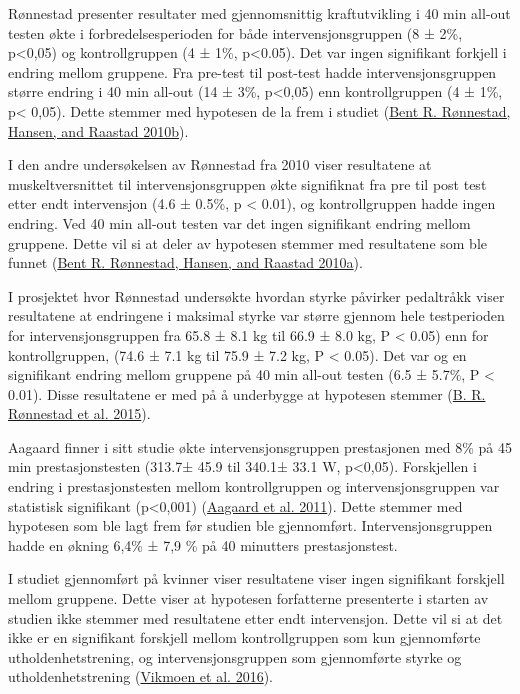 \documentclass[
]{book}
\begin{document}
Rønnestad presenter resultater med gjennomsnittig kraftutvikling i 40
min all-out testen økte i forbredelsesperioden for både
intervensjonsgruppen (8 ± 2\%, p\textless0,05) og kontrollgruppen (4 ±
1\%, p\textless0.05). Det var ingen signifikant forkjell i endring
mellom gruppene. Fra pre-test til post-test hadde intervensjonsgruppen
større endring i 40 min all-out (14 ± 3\%, p\textless0,05) enn
kontrollgruppen (4 ± 1\%, p\textless{} 0,05). Dette stemmer med
hypotesen de la frem i studiet
(\protect\hyperlink{ref-ruxf8nnestad2010a}{Bent R. Rønnestad, Hansen,
and Raastad 2010b}).

I den andre undersøkelsen av Rønnestad fra 2010 viser resultatene at
muskeltversnittet til intervensjonsgruppen økte signifiknat fra pre til
post test etter endt intervensjon (4.6 ± 0.5\%, p \textless{} 0.01), og
kontrollgruppen hadde ingen endring. Ved 40 min all-out testen var det
ingen signifikant endring mellom gruppene. Dette vil si at deler av
hypotesen stemmer med resultatene som ble funnet
(\protect\hyperlink{ref-ruxf8nnestad2010b}{Bent R. Rønnestad, Hansen,
and Raastad 2010a}).

I prosjektet hvor Rønnestad undersøkte hvordan styrke påvirker
pedaltråkk viser resultatene at endringene i maksimal styrke var større
gjennom hele testperioden for intervensjonsgruppen fra 65.8 ± 8.1 kg til
66.9 ± 8.0 kg, P \textless{} 0.05) enn for kontrollgruppen, (74.6 ± 7.1
kg til 75.9 ± 7.2 kg, P \textless{} 0.05). Det var og en signifikant
endring mellom gruppene på 40 min all-out testen (6.5 ± 5.7\%, P
\textless{} 0.01). Disse resultatene er med på å underbygge at hypotesen
stemmer (\protect\hyperlink{ref-ruxf8nnestad2015}{B. R. Rønnestad et al.
2015}).

Aagaard finner i sitt studie økte intervensjonsgruppen prestasjonen med
8\% på 45 min prestasjonstesten (313.7± 45.9 til 340.1± 33.1 W,
p\textless0,05). Forskjellen i endring i prestasjonstesten mellom
kontrollgruppen og intervensjonsgruppen var statistisk signifikant
(p\textless0,001) (\protect\hyperlink{ref-aagaard2011}{Aagaard et al.
2011}). Dette stemmer med hypotesen som ble lagt frem før studien ble
gjennomført. Intervensjonsgruppen hadde en økning 6,4\% ± 7,9 \% på 40
minutters prestasjonstest.

I studiet gjennomført på kvinner viser resultatene viser ingen
signifikant forskjell mellom gruppene. Dette viser at hypotesen
forfatterne presenterte i starten av studien ikke stemmer med
resultatene etter endt intervensjon. Dette vil si at det ikke er en
signifikant forskjell mellom kontrollgruppen som kun gjennomførte
utholdenhetstrening, og intervensjonsgruppen som gjennomførte styrke og
utholdenhetstrening (\protect\hyperlink{ref-vikmoen2016}{Vikmoen et al.
2016}).
\end{document}
